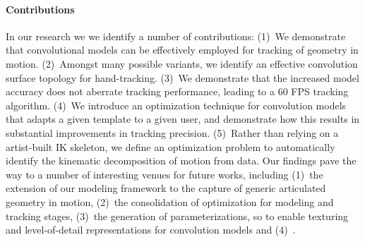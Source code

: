 \paragraph{Contributions}
In our research we we identify a number of contributions:
(1)~We demonstrate that convolutional models can be effectively employed for tracking of geometry in motion. 
(2)~Amongst many possible variants, we identify an effective convolution surface  topology for hand-tracking. 
(3)~We demonstrate that the increased model accuracy does not aberrate tracking performance, leading to a 60 FPS tracking algorithm.
(4)~We introduce an optimization technique for convolution models that adapts a given template to a given user, and demonstrate how this results in substantial improvements in tracking precision.
(5)~Rather than relying on a artist-built IK skeleton, we define an optimization problem to automatically identify the kinematic decomposition of motion from data.
%
\hspace{0in}
% 
Our findings pave the way to a number of interesting venues for future works, including 
(1)~the extension of our modeling framework to the capture of generic articulated geometry in motion, 
(2)~the consolidation of optimization for modeling and tracking stages, 
(3)~the generation of parameterizations, so to enable texturing and level-of-detail representations for convolution models and
(4)~. \
% 

